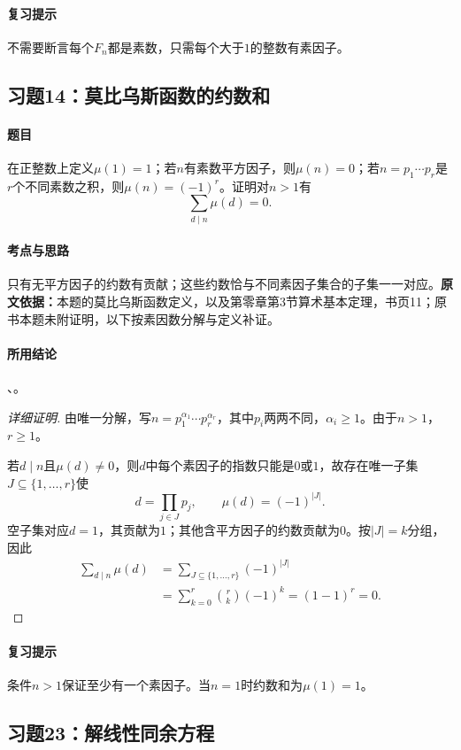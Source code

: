 \paragraph{复习提示}不需要断言每个$F_n$都是素数，只需每个大于$1$的整数有素因子。

\subsection{习题14：莫比乌斯函数的约数和}\label{exercise:0:14}
\paragraph{题目}在正整数上定义$\mu(1)=1$；若$n$有素数平方因子，则$\mu(n)=0$；若$n=p_1\cdots p_r$是$r$个不同素数之积，则$\mu(n)=(-1)^r$。证明对$n>1$有
\[
\sum_{d\mid n}\mu(d)=0.
\]
\paragraph{考点与思路}只有无平方因子的约数有贡献；这些约数恰与不同素因子集合的子集一一对应。\textbf{原文依据：}本题的莫比乌斯函数定义，以及第零章第3节算术基本定理，书页11；原书本题未附证明，以下按素因数分解与定义补证。
\paragraph{所用结论}、。
\begin{proof}[详细证明]
由唯一分解，写$n=p_1^{\alpha_1}\cdots p_r^{\alpha_r}$，其中$p_i$两两不同，$\alpha_i\geq1$。由于$n>1$，$r\geq1$。

若$d\mid n$且$\mu(d)\ne0$，则$d$中每个素因子的指数只能是$0$或$1$，故存在唯一子集$J\subseteq\{1,\ldots,r\}$使
\[
d=\prod_{j\in J}p_j,\qquad \mu(d)=(-1)^{|J|}.
\]
空子集对应$d=1$，其贡献为$1$；其他含平方因子的约数贡献为$0$。按$|J|=k$分组，因此
\begin{align*}
\sum_{d\mid n}\mu(d)
&=\sum_{J\subseteq\{1,\ldots,r\}}(-1)^{|J|}\\
&=\sum_{k=0}^r\binom rk(-1)^k=(1-1)^r=0.
\end{align*}
\end{proof}
\paragraph{复习提示}条件$n>1$保证至少有一个素因子。当$n=1$时约数和为$\mu(1)=1$。

\subsection{习题23：解线性同余方程}\label{exercise:0:23}
